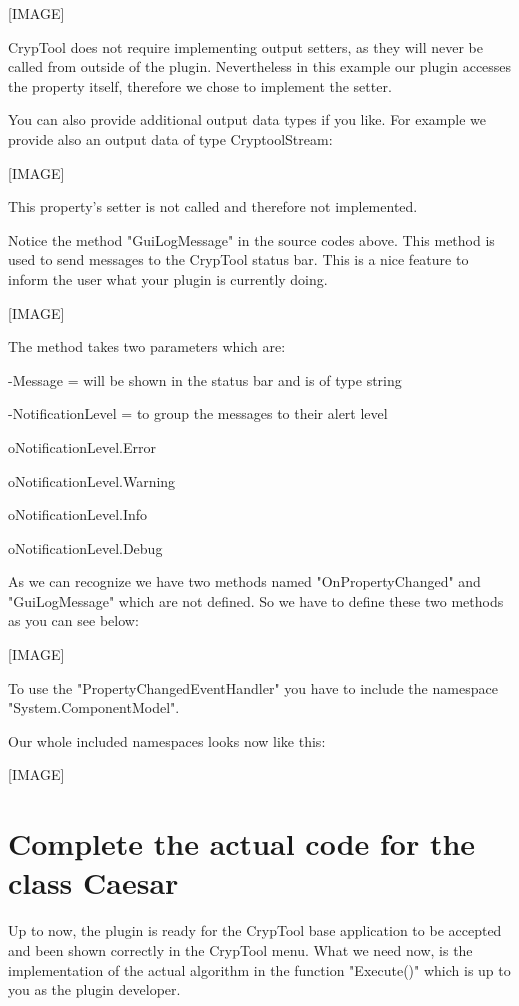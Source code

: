[IMAGE]

CrypTool does not require implementing output setters, as they will never be called from outside of the plugin. Nevertheless in this example our plugin accesses the property itself, therefore we chose to implement the setter.

You can also provide additional output data types if you like. For example we provide also an output data of type CryptoolStream:

[IMAGE]

This property's setter is not called and therefore not implemented.

Notice the method "GuiLogMessage" in the source codes above. This method is used to send messages to the CrypTool status bar. This is a nice feature to inform the user what your plugin is currently doing.

[IMAGE]

The method takes two parameters which are:

\hspace{20pt}-Message = will be shown in the status bar and is of type string

\hspace{20pt}-NotificationLevel = to group the messages to their alert level

\hspace{30pt}o\hspace{10pt}NotificationLevel.Error

\hspace{30pt}o\hspace{10pt}NotificationLevel.Warning

\hspace{30pt}o\hspace{10pt}NotificationLevel.Info

\hspace{30pt}o\hspace{10pt}NotificationLevel.Debug

As we can recognize we have two methods named "OnPropertyChanged" and "GuiLogMessage" which are not defined. So we have to define these two methods as you can see below:

[IMAGE]

To use the "PropertyChangedEventHandler" you have to include the namespace "System.ComponentModel".

Our whole included namespaces looks now like this:

[IMAGE]


\section{Complete the actual code for the class Caesar}\label{sec:CompleteTheActualCodeForTheClassMD5}
Up to now, the plugin is ready for the CrypTool base application to be accepted and been shown correctly in the CrypTool menu. What we need now, is the implementation of the actual algorithm in the function "Execute()" which is up to you as the plugin developer.

